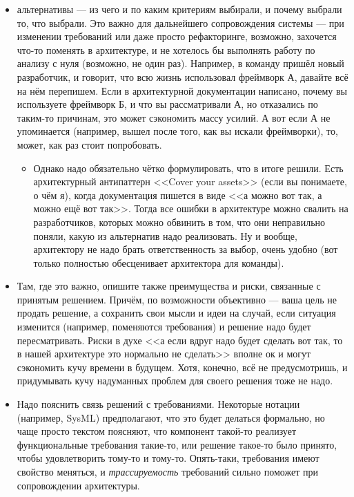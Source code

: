 \documentclass[a5paper]{article}
\begin{document}
\begin{itemize}
    \item альтернативы --- из чего и по каким критериям выбирали, и почему выбрали то, что выбрали. Это важно для дальнейшего сопровождения системы --- при изменении требований или даже просто рефакторинге, возможно, захочется что-то поменять в архитектуре, и не хотелось бы выполнять работу по анализу с нуля (возможно, не один раз). Например, в команду пришёл новый разработчик, и говорит, что всю жизнь использовал фреймворк А, давайте всё на нём перепишем. Если в архитектурной документации написано, почему вы используете фреймворк Б, и что вы рассматривали А, но отказались по таким-то причинам, это может сэкономить массу усилий. А вот если А не упоминается (например, вышел после того, как вы искали фреймворки), то, может, как раз стоит попробовать.
    \begin{itemize}
        \item Однако надо обязательно чётко формулировать, что в итоге решили. Есть архитектурный антипаттерн <<Cover your assets>> (если вы понимаете, о чём я), когда документация пишется в виде <<а можно вот так, а можно ещё вот так>>. Тогда все ошибки в архитектуре можно свалить на разработчиков, которых можно обвинить в том, что они неправильно поняли, какую из альтернатив надо реализовать. Ну и вообще, архитектору не надо брать ответственность за выбор, очень удобно (вот только полностью обесценивает архитектора для команды).
    \end{itemize}
    \item Там, где это важно, опишите также преимущества и риски, связанные с принятым решением. Причём, по возможности объективно --- ваша цель не продать решение, а сохранить свои мысли и идеи на случай, если ситуация изменится (например, поменяются требования) и решение надо будет пересматривать. Риски в духе <<а если вдруг надо будет сделать вот так, то в нашей архитектуре это нормально не сделать>> вполне ок и могут сэкономить кучу времени в будущем. Хотя, конечно, всё не предусмотришь, и придумывать кучу надуманных проблем для своего решения тоже не надо.
    \item Надо пояснить связь решений с требованиями. Некоторые нотации (например, SysML) предполагают, что это будет делаться формально, но чаще просто текстом поясняют, что компонент такой-то реализует функциональные требования такие-то, или решение такое-то было принято, чтобы удовлетворить тому-то и тому-то. Опять-таки, требования имеют свойство меняться, и \emph{трассируемость} требований сильно поможет при сопровождении архитектуры.
\end{itemize}
\end{document}
